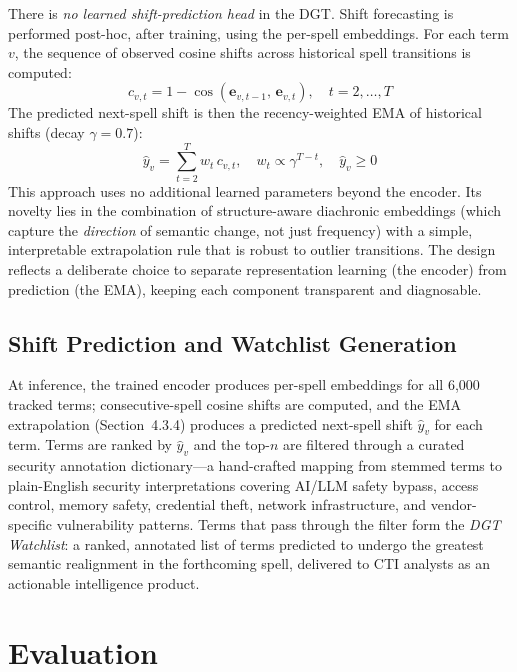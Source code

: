 \documentclass[12pt]{article}
\begin{document}
There is \textit{no learned shift-prediction head} in the DGT. Shift forecasting is performed post-hoc, after training, using the per-spell embeddings. For each term $v$, the sequence of observed cosine shifts across historical spell transitions is computed:
\begin{equation}
  c_{v,t} = 1 - \cos(\mathbf{e}_{v,t-1},\, \mathbf{e}_{v,t}), \quad t = 2, \ldots, T
\end{equation}
The predicted next-spell shift is then the recency-weighted EMA of historical shifts (decay $\gamma = 0.7$):
\begin{equation}
  \hat{y}_v = \sum_{t=2}^{T} w_t\, c_{v,t}, \quad w_t \propto \gamma^{T-t}, \quad \hat{y}_v \geq 0
\end{equation}
This approach uses no additional learned parameters beyond the encoder. Its novelty lies in the combination of structure-aware diachronic embeddings (which capture the \textit{direction} of semantic change, not just frequency) with a simple, interpretable extrapolation rule that is robust to outlier transitions. The design reflects a deliberate choice to separate representation learning (the encoder) from prediction (the EMA), keeping each component transparent and diagnosable.

\subsection{Shift Prediction and Watchlist Generation}

At inference, the trained encoder produces per-spell embeddings for all 6,000 tracked terms; consecutive-spell cosine shifts are computed, and the EMA extrapolation (Section~4.3.4) produces a predicted next-spell shift $\hat{y}_v$ for each term. Terms are ranked by $\hat{y}_v$ and the top-$n$ are filtered through a curated security annotation dictionary---a hand-crafted mapping from stemmed terms to plain-English security interpretations covering AI/LLM safety bypass, access control, memory safety, credential theft, network infrastructure, and vendor-specific vulnerability patterns. Terms that pass through the filter form the \textit{DGT Watchlist}: a ranked, annotated list of terms predicted to undergo the greatest semantic realignment in the forthcoming spell, delivered to CTI analysts as an actionable intelligence product.

\section{Evaluation}
\bodyfont
\end{document}
